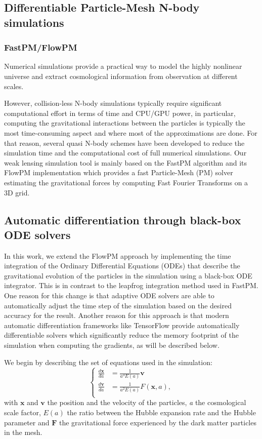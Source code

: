 \documentclass[twocolumn,twocolappendix]{aastex63}
\begin{document}
\subsection{Differentiable Particle-Mesh N-body simulations}
\subsubsection{FastPM/FlowPM}

Numerical simulations provide a practical way to model the highly nonlinear universe and extract cosmological information from observation at different scales. 

However, collision-less N-body simulations typically require significant computational effort in terms of time and CPU/GPU power, in particular, computing the gravitational interactions between the particles is typically the most time-consuming aspect and where most of the approximations are done. 
For that reason, several quasi N-body schemes have been developed to reduce the simulation time and the computational cost of full numerical simulations. 
Our weak lensing simulation tool is mainly based on the FastPM algorithm \citep{2019ascl.soft05010F} and its FlowPM \citep{modi2021flowpm} implementation which provides a fast Particle-Mesh (PM) solver estimating the gravitational forces by computing Fast Fourier Transforms on a 3D grid.

\subsection{Automatic differentiation through black-box ODE solvers}\label{Backpropagation_of_ODE_solutions}
In this work, we extend the FlowPM approach by implementing the time integration of the Ordinary Differential Equations
(ODEs) that describe the gravitational evolution of the particles in the simulation using a black-box ODE integrator. This is in contrast to the leapfrog integration method used in FastPM. One reason for this change is that adaptive ODE solvers are able to automatically adjust the time step of the simulation based on the desired accuracy for the result. Another reason for this approach is that modern automatic differentiation frameworks like TensorFlow provide automatically differentiable solvers which significantly reduce the memory footprint of the simulation when computing the gradients, as will be described below.


We begin by describing the set of equations used in the simulation:
\begin{equation}
    \left\{ \begin{array}{ll}
        \frac{d \mathbf{x}}{d a} & = \frac{1}{a^3 E(a)} \mathbf{v} \\
        \frac{d \mathbf{v}}{d a} & =  \frac{1}{a^2 E(a)} F(\mathbf{x}, a), \\
    \end{array} \right.
\end{equation}
with $\mathbf{x}$ and $\mathbf{v}$ the position and the velocity of the particles, \textit{a} the cosmological scale factor, $E(a)$ the ratio between the Hubble expansion rate and the Hubble parameter and $\mathbf{F}$ the gravitational force experienced by the dark matter particles in the mesh.
\end{document}
